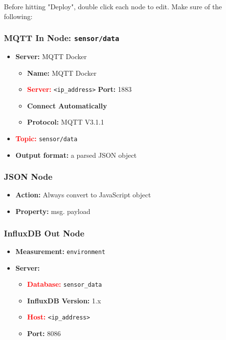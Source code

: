 \documentclass[onecolumn]{article}
\begin{document}
    Before hitting "Deploy", double click each node to edit. Make sure of the following:


\subsubsection*{MQTT In Node: \texttt{sensor/data}}

\begin{itemize}
  \item \textbf{Server:} MQTT Docker 
  \begin{itemize}
      \item \textbf{Name:} MQTT Docker
      \item \textcolor{red}{\textbf{Server:}} \texttt{<ip\_address>}  \textbf{Port:} 1883
      \item \textbf{Connect Automatically}
      \item \textbf{Protocol:} MQTT V3.1.1
  \end{itemize}
  \item \textcolor{red}{\textbf{Topic:}} \texttt{sensor/data}
  \item \textbf{Output format:} a parsed JSON object
  
\end{itemize}

\subsubsection*{JSON Node}

\begin{itemize}
  \item \textbf{Action:} Always convert to JavaScript object
  \item \textbf{Property:} msg. payload
\end{itemize}

\subsubsection*{InfluxDB Out Node}

\begin{itemize}
  \item \textbf{Measurement:} \texttt{environment}
  \item \textbf{Server:}
    \begin{itemize}
      \item \textcolor{red}{\textbf{Database:}} \texttt{sensor\_data}
      \item \textbf{InfluxDB Version:} 1.x
      \item \textcolor{red}{\textbf{Host:}} \texttt{<ip\_address>}
      \item \textbf{Port:} 8086
    \end{itemize}
\end{itemize}
\end{document}
